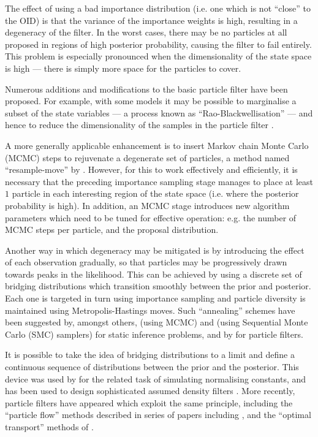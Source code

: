 \documentclass{statsoc}
\begin{document}
The effect of using a bad importance distribution (i.e. one which is not ``close'' to the OID) is that the variance of the importance weights is high, resulting in a degeneracy of the filter. In the worst cases, there may be no particles at all proposed in regions of high posterior probability, causing the filter to fail entirely. This problem is especially pronounced when the dimensionality of the state space is high --- there is simply more space for the particles to cover.

Numerous additions and modifications to the basic particle filter have been proposed. For example, with some models it may be possible to marginalise a subset of the state variables --- a process known as ``Rao-Blackwellisation'' --- and hence to reduce the dimensionality of the samples in the particle filter \citep{Casella1996,Doucet2000}.

A more generally applicable enhancement is to insert Markov chain Monte Carlo (MCMC) steps to rejuvenate a degenerate set of particles, a method named ``resample-move'' by \citet{Gilks2001}. However, for this to work effectively and efficiently, it is necessary that the preceding importance sampling stage manages to place at least $1$ particle in each interesting region of the state space (i.e. where the posterior probability is high). In addition, an MCMC stage introduces new algorithm parameters which need to be tuned for effective operation: e.g. the number of MCMC steps per particle, and the proposal distribution.

Another way in which degeneracy may be mitigated is by introducing the effect of each observation gradually, so that particles may be progressively drawn towards peaks in the likelihood. This can be achieved by using a discrete set of bridging distributions which transition smoothly between the prior and posterior. Each one is targeted in turn using importance sampling and particle diversity is maintained using Metropolis-Hastings moves. Such ``annealing'' schemes have been suggested by, amongst others, \citet{Neal2001} (using MCMC) and \citet{DelMoral2006} (using Sequential Monte Carlo (SMC) samplers) for static inference problems, and by \citet{Godsill2001b,Gall2007,Deutscher2000} for particle filters.

It is possible to take the idea of bridging distributions to a limit and define a continuous sequence of distributions between the prior and the posterior. This device was used by \citet{Gelman1998} for the related task of simulating normalising constants, and has been used to design sophisticated assumed density filters \citep{Hanebeck2003a,Hanebeck2012,Hagmar2011}. More recently, particle filters have appeared which exploit the same principle, including the ``particle flow'' methods described in series of papers including \citep{Daum2008,Daum2011d}, and the ``optimal transport'' methods of \cite{Reich2011,Reich2012a}.
\end{document}
